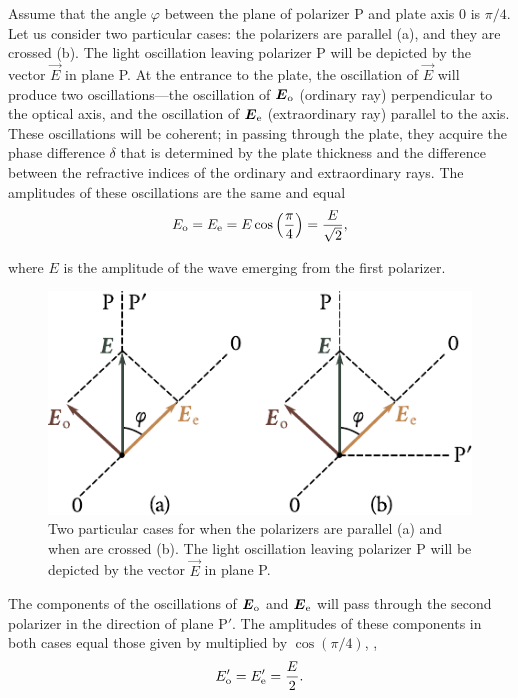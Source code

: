 Assume that the angle $\varphi$ between the plane of polarizer P and plate axis $0$ is $\pi/4$.
Let us consider two particular cases: the polarizers are parallel (a), and they are crossed (b).
The light oscillation leaving polarizer P will be depicted by the vector $\vec{E}$ in plane P.
At the entrance to the plate, the oscillation of $\vec{E}$ will produce two oscillations---the oscillation of $\boldsymbol{E}_{\text{o}}$ (ordinary ray) perpendicular to the optical axis, and the oscillation of $\boldsymbol{E}_{\text{e}}$ (extraordinary ray) parallel to the axis.
These oscillations will be coherent; in passing through the plate, they acquire the phase difference $\delta$ that is determined by the plate thickness and the difference between the refractive indices of the ordinary and extraordinary rays.
The amplitudes of these oscillations are the same and equal
\begin{equation}\label{eq:19_14}
	E_{\text{o}} = E_{\text{e}} = E \cos\left(\frac{\pi}{4}\right) = \frac{E}{\sqrt{2}},
\end{equation}

\noindent
where $E$ is the amplitude of the wave emerging from the first polarizer.

\begin{figure}[t]
	\begin{center}
		\includegraphics[scale=1]{figures/ch_19/fig_19_17.pdf}
        \caption[]{Two particular cases for when the polarizers are parallel (a) and when are crossed (b). The light oscillation leaving polarizer P will be depicted by the vector $\vec{E}$ in plane P.}
		\label{fig:19_17}
	\end{center}
	\vspace{-0.8cm}
\end{figure}

The components of the oscillations of $\boldsymbol{E}_{\text{o}}$ and $\boldsymbol{E}_{\text{e}}$ will pass through the second polarizer in the direction of plane P$'$.
The amplitudes of these components in both cases equal those given by  multiplied by $\cos(\pi/4)$, \ie,
\begin{equation}\label{eq:19_15}
	E_{\text{o}}' = E_{\text{e}}' = \frac{E}{2}.
\end{equation}

